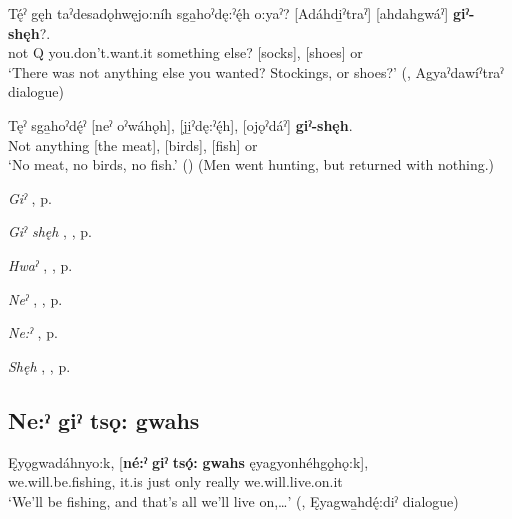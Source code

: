 \ea
\label{ex:npar65}
\gll Tę́ˀ gęh taˀdesadǫhwęjo:níh sga̱hoˀdę:ˀę́h o:yaˀ? [Adáhdi̱ˀtraˀ] [ahdahgwáˀ] \textbf{giˀ-shęh}?.\\
not Q you.don’t.want.it something else? [socks], [shoes] or\\
\glt ‘There was not anything else you wanted? Stockings, or shoes?’ (\cite[225]{mithun_watewayestanih_1984}, Agyaˀdawíˀtraˀ dialogue)
\z


\ea
\label{ex:npar66}
\gll Tęˀ sga̱hoˀdę́ˀ [neˀ oˀwáhǫh], [ji̱ˀdę:ˀę́h], [ojǫˀdáˀ] \textbf{giˀ-shęh}.\\
Not anything [the meat], [birds], [fish] or\\
\glt ‘No meat, no birds, no fish.’ (\cite{carrier_legends_2013}) (Men went hunting, but returned with nothing.)
\z

\begin{CayugaRelated}
\item \textit{Giˀ} , p. \pageref{p:[giˀ]}\\
\item \textit{Giˀ shęh} , , p. \pageref{p:[giˀ shęh]}\\
\item \textit{Hwaˀ} , , p. \pageref{p:[hwaˀ]}\\
\item \textit{Neˀ} , , p. \pageref{p:[neˀ]}\\
\item \textit{Ne:ˀ} , p. \pageref{p:[ne:ˀ] `it is’}\\
\item \textit{Shęh} , , p. \pageref{p:[shęh] `because’}
\end{CayugaRelated}

\subsection*{\textbf{Ne:ˀ giˀ tsǫ: gwahs} } \label{p:[ne:ˀ giˀ tsǫ: gwahs]}

\ea
\label{ex:npar67}
\gll Ęyǫgwadáhnyo:k, [\textbf{né:ˀ} \textbf{giˀ} \textbf{tsǫ́:} \textbf{gwahs} ęyagyonhéhgǫ̱hǫ:k],\\
we.will.be.fishing, it.is just only really we.will.live.on.it\\
\glt ‘We’ll be fishing, and that’s all we’ll live on,…’ (\cite[402]{mithun_watewayestanih_1984}, Ęyagwa̱hdę́:diˀ dialogue)
\z

